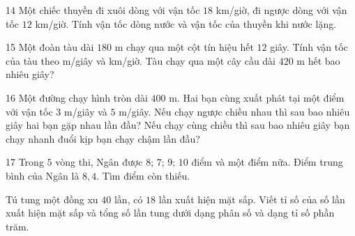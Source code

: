 \gap
\begin{probbox}{14}{\relax}
Một chiếc thuyền đi xuôi dòng với vận tốc $18$ km/giờ, đi ngược dòng với vận tốc $12$ km/giờ. Tính vận tốc dòng nước và vận tốc của thuyền khi nước lặng.
\end{probbox}
\gap
\begin{probbox}{15}{}
Một đoàn tàu dài $180$ m chạy qua một cột tín hiệu hết $12$ giây.  Tính vận tốc của tàu theo m/giây và km/giờ.  Tàu chạy qua một cây cầu dài $420$ m hết bao nhiêu giây?
\end{probbox}
\gap
\begin{probbox}{16}{}
Một đường chạy hình tròn dài $400$ m. Hai bạn cùng xuất phát tại một điểm với vận tốc $3$ m/giây và $5$ m/giây.  Nếu chạy ngược chiều nhau thì sau bao nhiêu giây hai bạn gặp nhau lần đầu?  Nếu chạy cùng chiều thì sau bao nhiêu giây bạn chạy nhanh đuổi kịp bạn chạy chậm lần đầu?
\end{probbox}
\gap
\begin{probbox}{17}{\relax}
 Trong $5$ vòng thi, Ngân được $8$; $7$; $9$; $10$ điểm và một điểm nữa. Điểm trung bình của Ngân là $8{,}4$. Tìm điểm còn thiếu.\par
{} Tú tung một đồng xu $40$ lần, có $18$ lần xuất hiện mặt sấp. Viết tỉ số của số lần xuất hiện mặt sấp và tổng số lần tung dưới dạng phân số và dạng tỉ số phần trăm.
\end{probbox}
